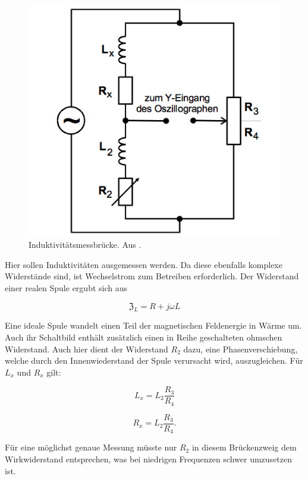 \begin{figure}
  \centering
  \includegraphics[scale=0.5]{content/induktivitätsmessbrücke.jpg}
  \caption{Induktivitätsmessbrücke. Aus \cite{anleitung302}.}
  \label{fig:induktivität}
\end{figure}

Hier sollen Induktivitäten ausgemessen werden. Da diese ebenfalls komplexe Widerstände sind, ist Wechselstrom zum Betreiben erforderlich.
Der Widerstand einer realen Spule ergubt sich aus

\begin{equation}
  \mathfrak{Z}_L = R + j\omega L
\end{equation}


Eine ideale Spule wandelt einen Teil der magnetischen Feldenergie in Wärme um. Auch ihr Schaltbild enthält zusätzlich einen in Reihe geschalteten ohmschen Widerstand.
Auch hier dient der Widerstand $R_{2}$ dazu, eine Phasenverschiebung, welche durch den Innenwiederstand der Spule verursacht wird, auszugleichen.
Für $L_x$ und $R_x$ gilt:

\begin{equation}
  L_x = L_{2} \frac{R_3}{R_4}
\end{equation}

\begin{equation}
  R_x = L_{2} \frac{R_3}{R_4}.
\end{equation}

Für eine möglichst genaue Messung müsste nur $R_{2}$ in diesem Brückenzweig dem Wirkwiderstand entsprechen, was bei niedrigen Frequenzen schwer umzusetzen ist.


